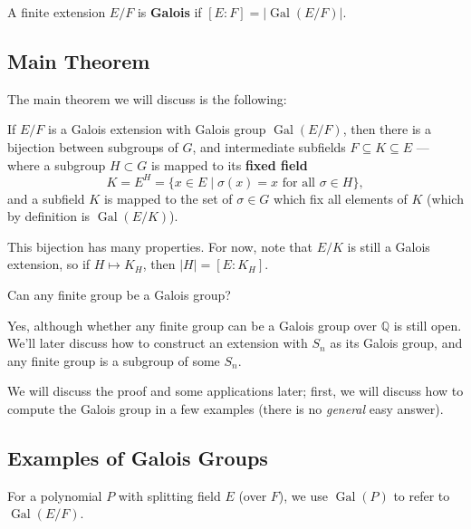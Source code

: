 \begin{definition}
    A finite extension $E/F$ is \textbf{Galois} if $[E : F] = \lvert\operatorname{Gal}(E/F)\rvert$. 
\end{definition}

\subsection{Main Theorem}

The main theorem we will discuss is the following:

\begin{theorem} \label{main theorem of galois theory}
    If $E/F$ is a Galois extension with Galois group $\operatorname{Gal}(E/F)$, then there is a bijection between subgroups of $G$, and intermediate subfields $F \subseteq K \subseteq E$ --- where a subgroup $H \subset G$ is mapped to its \textbf{fixed field} \[K = E^H = \{x \in E \mid \sigma(x) = x \text{ for all } \sigma \in H\},\] and a subfield $K$ is mapped to the set of $\sigma \in G$ which fix all elements of $K$ (which by definition is $\operatorname{Gal}(E/K)$).
\end{theorem}

This bijection has many properties. For now, note that $E/K$ is still a Galois extension, so if $H \mapsto K_H$, then $\lvert H \rvert = [E : K_H]$. 

\begin{question}
Can any finite group be a Galois group?
\end{question}

\begin{ans}
Yes, although whether any finite group can be a Galois group over $\mathbb{Q}$ is still open. We'll later discuss how to construct an extension with $S_n$ as its Galois group, and any finite group is a subgroup of some $S_n$. 
\end{ans}

We will discuss the proof and some applications later; first, we will discuss how to compute the Galois group in a few examples (there is no \emph{general} easy answer). 

\subsection{Examples of Galois Groups}

For a polynomial $P$ with splitting field $E$ (over $F$), we use $\operatorname{Gal}(P)$ to refer to $\operatorname{Gal}(E/F)$. 

